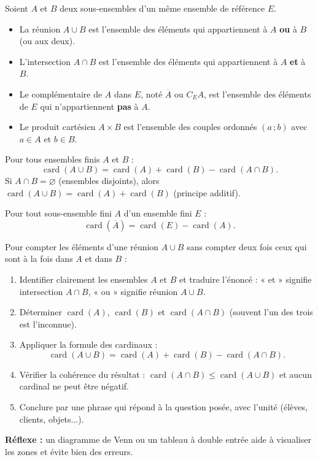 \documentclass[11pt]{article}
\newcommand{\cle}[1]{{\popxbold\color{popdark}#1}}
\begin{document}
\begin{definition}
Soient $A$ et $B$ deux sous-ensembles d'un même ensemble de référence $E$.
\begin{itemize}
\item La \cle{réunion} $A\cup B$ est l'ensemble des éléments qui appartiennent à $A$ \textbf{ou} à $B$ (ou aux deux).
\item L'\cle{intersection} $A\cap B$ est l'ensemble des éléments qui appartiennent à $A$ \textbf{et} à $B$.
\item Le \cle{complémentaire} de $A$ dans $E$, noté $\overline{A}$ ou $C_E A$, est l'ensemble des éléments de $E$ qui n'appartiennent \textbf{pas} à $A$.
\item Le \cle{produit cartésien} $A\times B$ est l'ensemble des \cle{couples} ordonnés $(a\,;b)$ avec $a\in A$ et $b\in B$.
\end{itemize}
\end{definition}

\begin{propriete}
Pour tous ensembles finis $A$ et $B$ :
\[ \operatorname{card}(A\cup B)=\operatorname{card}(A)+\operatorname{card}(B)-\operatorname{card}(A\cap B). \]
Si $A\cap B=\varnothing$ (ensembles \cle{disjoints}), alors $\operatorname{card}(A\cup B)=\operatorname{card}(A)+\operatorname{card}(B)$ (principe additif).
\end{propriete}

\begin{propriete}
Pour tout sous-ensemble fini $A$ d'un ensemble fini $E$ :
\[ \operatorname{card}(\overline{A})=\operatorname{card}(E)-\operatorname{card}(A). \]
\end{propriete}

\begin{methode}
Pour compter les éléments d'une réunion $A\cup B$ sans compter deux fois ceux qui sont à la fois dans $A$ et dans $B$ :
\begin{enumerate}
\item Identifier clairement les ensembles $A$ et $B$ et traduire l'énoncé : « et » signifie \cle{intersection} $A\cap B$, « ou » signifie \cle{réunion} $A\cup B$.
\item Déterminer $\operatorname{card}(A)$, $\operatorname{card}(B)$ et $\operatorname{card}(A\cap B)$ (souvent l'un des trois est l'inconnue).
\item Appliquer la \cle{formule des cardinaux} :
\[ \operatorname{card}(A\cup B)=\operatorname{card}(A)+\operatorname{card}(B)-\operatorname{card}(A\cap B). \]
\item Vérifier la cohérence du résultat : $\operatorname{card}(A\cap B)\leq \operatorname{card}(A\cup B)$ et aucun cardinal ne peut être négatif.
\item Conclure par une phrase qui répond à la question posée, avec l'unité (élèves, clients, objets...).
\end{enumerate}
\textbf{Réflexe :} un diagramme de Venn ou un tableau à double entrée aide à visualiser les zones et évite bien des erreurs.
\end{methode}
\end{document}

